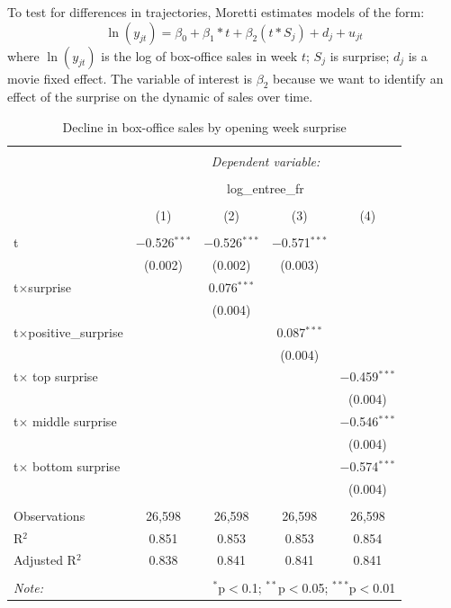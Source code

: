 \noindent To test for differences in trajectories, Moretti estimates models of the form: \begin{equation}\label{eq_divergence}
\ln(y_{jt})=\beta_0+\beta_1*t+\beta_2(t*S_j)+d_j+u_{jt}
\end{equation}
where $\ln(y_{jt})$ is the log of box-office sales in week $t$; $S_j$ is surprise; $d_j$ is a movie fixed effect. The variable of interest is $\beta_2$ because we want to identify an effect of the surprise on the dynamic of sales over time.
\begin{table}[!htbp] \centering 
	\caption{Decline in box-office sales by opening week surprise} 
	\label{graph_divergence} 
	\begin{tabular}{@{\extracolsep{0pt}}lcccc} 
		\\[-1.8ex]\hline 
		\hline \\[-1.8ex] 
		& \multicolumn{4}{c}{\textit{Dependent variable:}} \\ 
		\cline{2-5} 
		\\[-1.8ex] & \multicolumn{4}{c}{log\_entree\_fr} \\ 
		\\[-1.8ex] & (1) & (2) & (3) & (4)\\ 
		\hline \\[-1.8ex] 
		t & $-$0.526$^{***}$ & $-$0.526$^{***}$ & $-$0.571$^{***}$ &  \\ 
		& (0.002) & (0.002) & (0.003) &  \\ 
		t$\times$surprise &  & 0.076$^{***}$ &  &  \\ 
		&  & (0.004) &  &  \\ 
		t$\times$positive\_surprise &  &  & 0.087$^{***}$ &  \\ 
		&  &  & (0.004) &  \\ 
		t$\times$ top surprise &  &  &  & $-$0.459$^{***}$ \\ 
		&  &  &  & (0.004) \\ 
		t$\times$ middle surprise &  &  &  & $-$0.546$^{***}$ \\ 
		&  &  &  & (0.004) \\ 
		t$\times$ bottom surprise &  &  &  & $-$0.574$^{***}$ \\ 
		&  &  &  & (0.004) \\ 
		\hline \\[-1.8ex] 
		Observations & 26,598 & 26,598 & 26,598 & 26,598 \\ 
		R$^{2}$ & 0.851 & 0.853 & 0.853 & 0.854 \\ 
		Adjusted R$^{2}$ & 0.838 & 0.841 & 0.841 & 0.841 \\ 
		\hline 
		\hline \\[-1.8ex] 
		\textit{Note:}  & \multicolumn{4}{r}{$^{*}$p$<$0.1; $^{**}$p$<$0.05; $^{***}$p$<$0.01} \\ 
	\end{tabular} 
\end{table}

